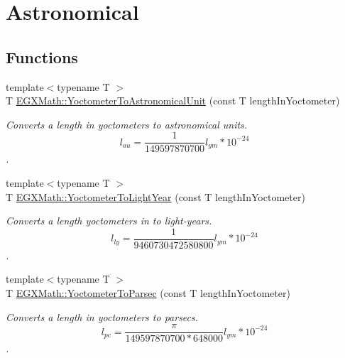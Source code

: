\hypertarget{group___e_g_x_math-_conversions-_length_conversions-_yoctometer-_astronomical}{}\section{Astronomical}
\label{group___e_g_x_math-_conversions-_length_conversions-_yoctometer-_astronomical}
\subsection*{Functions}
\begin{DoxyCompactItemize}
\item 
{\footnotesize template$<$typename T $>$ }\\T \mbox{\hyperlink{group___e_g_x_math-_conversions-_length_conversions-_yoctometer-_astronomical_ga6963327b8caa5f9a231197768126efc2}{E\+G\+X\+Math\+::\+Yoctometer\+To\+Astronomical\+Unit}} (const T length\+In\+Yoctometer)
\begin{DoxyCompactList}\small\item\em Converts a length in yoctometers to astronomical units. \[ l_{au}= \frac{1}{149597870700} l_{ym} * 10^{-24} \]. \end{DoxyCompactList}\item 
{\footnotesize template$<$typename T $>$ }\\T \mbox{\hyperlink{group___e_g_x_math-_conversions-_length_conversions-_yoctometer-_astronomical_gab1406f246c0472c4cef3ee0f5a6b1221}{E\+G\+X\+Math\+::\+Yoctometer\+To\+Light\+Year}} (const T length\+In\+Yoctometer)
\begin{DoxyCompactList}\small\item\em Converts a length yoctometers in to light-\/years. \[ l_{ly}= \frac{1}{9460730472580800} l_{ym} * 10^{-24} \]. \end{DoxyCompactList}\item 
{\footnotesize template$<$typename T $>$ }\\T \mbox{\hyperlink{group___e_g_x_math-_conversions-_length_conversions-_yoctometer-_astronomical_ga6856c1dd6b2d31388b4138dcb03bd8ce}{E\+G\+X\+Math\+::\+Yoctometer\+To\+Parsec}} (const T length\+In\+Yoctometer)
\begin{DoxyCompactList}\small\item\em Converts a length in yoctometers to parsecs. \[ l_{pc}=\frac{\pi}{149597870700 * 648000} l_{ym} * 10^{-24} \]. \end{DoxyCompactList}\end{DoxyCompactItemize}


